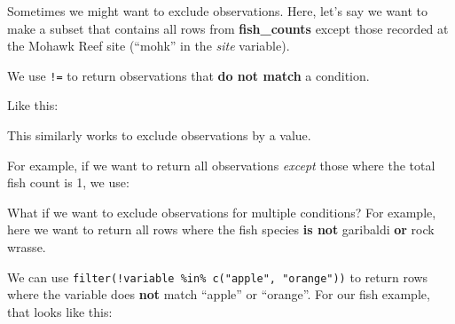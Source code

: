 \documentclass[]{book}
\newenvironment{Shaded}{\begin{snugshade}}{\end{snugshade}}
\newcommand{\DecValTok}[1]{\textcolor[rgb]{0.00,0.00,0.81}{#1}}
\newcommand{\KeywordTok}[1]{\textcolor[rgb]{0.13,0.29,0.53}{\textbf{#1}}}
\newcommand{\NormalTok}[1]{#1}
\newcommand{\OperatorTok}[1]{\textcolor[rgb]{0.81,0.36,0.00}{\textbf{#1}}}
\newcommand{\StringTok}[1]{\textcolor[rgb]{0.31,0.60,0.02}{#1}}
\begin{document}
Sometimes we might want to exclude observations. Here, let's say we want to make a subset that contains all rows from \textbf{fish\_counts} except those recorded at the Mohawk Reef site (``mohk'' in the \emph{site} variable).

We use \texttt{!=} to return observations that \textbf{do not match} a condition.

Like this:

\begin{Shaded}
\end{Shaded}

This similarly works to exclude observations by a value.

For example, if we want to return all observations \emph{except} those where the total fish count is 1, we use:

\begin{Shaded}
\end{Shaded}

What if we want to exclude observations for multiple conditions? For example, here we want to return all rows where the fish species \textbf{is not} garibaldi \textbf{or} rock wrasse.

We can use \texttt{filter(!variable\ \%in\%\ c("apple",\ "orange"))} to return rows where the variable does \textbf{not} match ``apple'' or ``orange''. For our fish example, that looks like this:

\begin{Shaded}
\end{Shaded}
\end{document}
